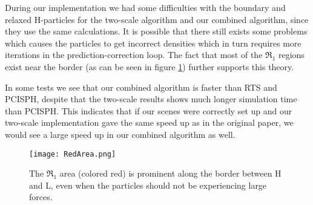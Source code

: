 \documentclass[../../main.tex]{subfiles}
\begin{document}
During our implementation we had some difficulties with the boundary and relaxed H-particles for the two-scale algorithm and our combined algorithm, since they use the same calculations. It is possible that there still exists some problems which causes the particles to get incorrect densities which in turn requires more iterations in the prediction-correction loop. The fact that most of the $\Re_1$ regions exist near the border (as can be seen in figure \ref{fig:redarea}) further supports this theory. 

In some tests we see that our combined algorithm is faster than RTS and PCISPH, despite that the two-scale results shows much longer simulation time than PCISPH. This indicates that if our scenes were correctly set up and our two-scale implementation gave the same speed up as in the original paper, we would see a large speed up in our combined algorithm as well. 


\begin{figure}[h]
    \centering
    \texttt{[image: RedArea.png]}
    \caption[Lower time step along the border]{The $\Re_1$ area (colored red) is prominent along the border between H and L, even when the particles should not be experiencing large forces. }
    \label{fig:redarea}
\end{figure}
\end{document}
